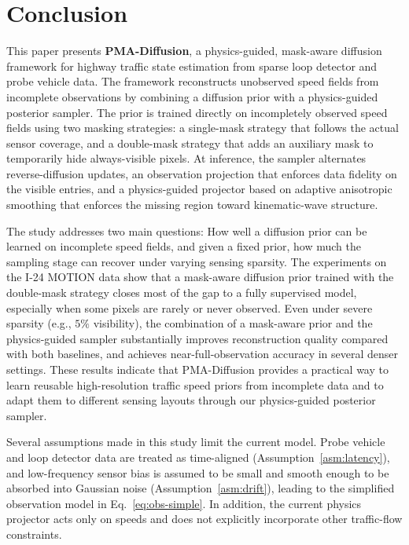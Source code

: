 \documentclass[a4paper,fleqn]{cas-sc}
\numberwithin{equation}{section}
\begin{document}
\section{Conclusion}
\label{sec:conclu}
This paper presents \textbf{PMA-Diffusion}, a physics-guided, mask-aware diffusion framework for highway traffic state estimation from sparse loop detector and probe vehicle data. The framework reconstructs unobserved speed fields from incomplete observations by combining a diffusion prior with a physics-guided posterior sampler. The prior is trained directly on incompletely observed speed fields using two masking strategies: a single-mask strategy that follows the actual sensor coverage, and a double-mask strategy that adds an auxiliary mask to temporarily hide always-visible pixels. At inference, the sampler alternates reverse-diffusion updates, an observation projection that enforces data fidelity on the visible entries, and a physics-guided projector based on adaptive anisotropic smoothing that enforces the missing region toward kinematic-wave structure.

The study addresses two main questions: How well a diffusion prior can be learned on incomplete speed fields, and given a fixed prior, how much the sampling stage can recover under varying sensing sparsity. The experiments on the I-24 MOTION data show that a mask-aware diffusion prior trained with the double-mask strategy closes most of the gap to a fully supervised model, especially when some pixels are rarely or never observed. Even under severe sparsity (e.g., $5\%$ visibility), the combination of a mask-aware prior and the physics-guided sampler substantially improves reconstruction quality compared with both baselines, and achieves near-full-observation accuracy in several denser settings. These results indicate that PMA-Diffusion provides a practical way to learn reusable high-resolution traffic speed priors from incomplete data and to adapt them to different sensing layouts through our physics-guided posterior sampler.

Several assumptions made in this study limit the current model. Probe vehicle and loop detector data are treated as time-aligned (Assumption~\ref{asm:latency}), and low-frequency sensor bias is assumed to be small and smooth enough to be absorbed into Gaussian noise (Assumption~\ref{asm:drift}), leading to the simplified observation model in Eq.~\eqref{eq:obs-simple}. In addition, the current physics projector acts only on speeds and does not explicitly incorporate other traffic-flow constraints.
\end{document}
